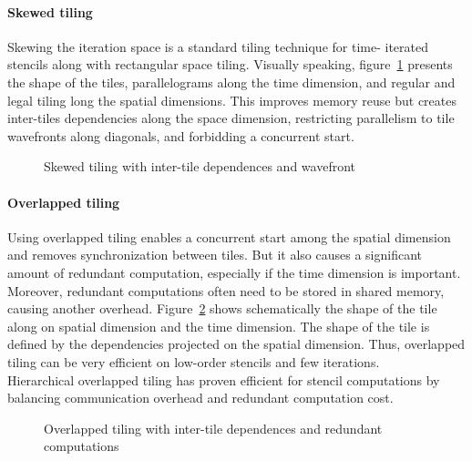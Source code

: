 \documentclass[a4paper,11pt]{article}
\begin{document}
  \paragraph{Skewed tiling} Skewing the iteration space is a standard tiling technique for time-
  iterated stencils along with rectangular space tiling. Visually speaking, figure~\ref{skewed-tiling}
  presents the shape of the tiles, parallelograms along the time dimension, and regular and legal
  tiling long the spatial dimensions. This improves memory reuse but creates inter-tiles
  dependencies along the space dimension, restricting parallelism to tile wavefronts along
  diagonals, and forbidding a concurrent start.
  
  \begin{figure}[h]
   
   \caption{Skewed tiling with inter-tile dependences and wavefront}
   \label{skewed-tiling}
  \end{figure}
  
  \paragraph{Overlapped tiling} Using overlapped tiling enables a concurrent start among the spatial 
  dimension and removes synchronization between tiles. But it also causes a significant
amount of redundant computation, especially if the time dimension is important. Moreover, 
redundant computations often need to be stored in shared memory, causing another
overhead. Figure~\ref{over-tiling} shows schematically the shape of the tile along on spatial dimension
and the time dimension. The shape of the tile is defined by the dependencies projected on
the spatial dimension. Thus, overlapped tiling can be very efficient on low-order stencils
and few iterations. \\
Hierarchical overlapped tiling \cite{zhou_hierarchical_2012} has proven efficient for stencil computations by balancing
communication overhead and redundant computation cost.

  \begin{figure}[h]
   
   \caption{Overlapped tiling with inter-tile dependences and redundant computations}
   \label{over-tiling}
  \end{figure}
 
\end{document}
